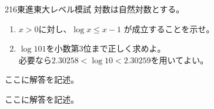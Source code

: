 \begin{prob}{216}{}{東進東大レベル模試}
 対数は自然対数とする。
 \begin{enumerate}
  \item $x>0$に対し、$\log x \le x-1$ が成立することを示せ。
  \item $\log 101$を小数第3位まで正しく求めよ。 \\ 必要なら$2.30258<\log 10 <2.30259$を用いてよい。
 \end{enumerate}
\end{prob}
ここに解答を記述。

ここに解答を記述。